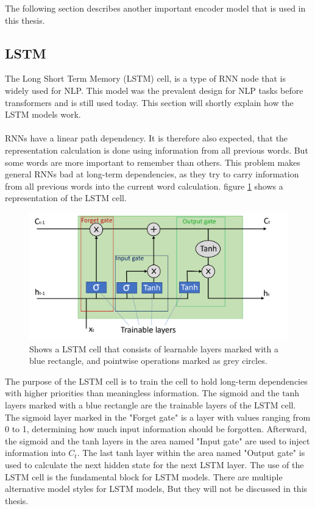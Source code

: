 The following section describes another important encoder model that is used in this thesis.


\subsection{LSTM} \label{sec:LSTM}
The Long Short Term Memory (LSTM) cell, is a type of RNN node that is widely used for NLP. This model was the prevalent design for NLP tasks before transformers and is still used today. This section will shortly explain how the LSTM models work.
\\\\
RNNs have a linear path dependency. It is therefore also expected, that the representation calculation is done using information from all previous words. But some words are more important to remember than others. This problem makes general RNNs bad at long-term dependencies, as they try to carry information from all previous words into the current word calculation. figure \ref{fig:LSTM_cell} shows a representation of the LSTM cell. 


\begin{figure}[ht]
    \centering
    \includegraphics[width=12cm]{img/LSTM_cell.png}
    \caption{Shows a LSTM cell that consists of learnable layers marked with a blue rectangle, and pointwise operations marked as grey circles.}
    \label{fig:LSTM_cell}
\end{figure}

The purpose of the LSTM cell is to train the cell to hold long-term dependencies with higher priorities than meaningless information. The $\text{sigmoid}$ and the $\text{tanh}$ layers marked with a blue rectangle are the trainable layers of the LSTM cell. The sigmoid layer marked in the "Forget gate" is a layer with values ranging from 0 to 1, determining how much input information should be forgotten. Afterward, the sigmoid and the tanh layers in the area named "Input gate" are used to inject information into $C_t$. The last tanh layer within the area named "Output gate" is used to calculate the next hidden state for the next LSTM layer. The use of the LSTM cell is the fundamental block for LSTM models. There are multiple alternative model styles for LSTM models, But they will not be discussed in this thesis.
